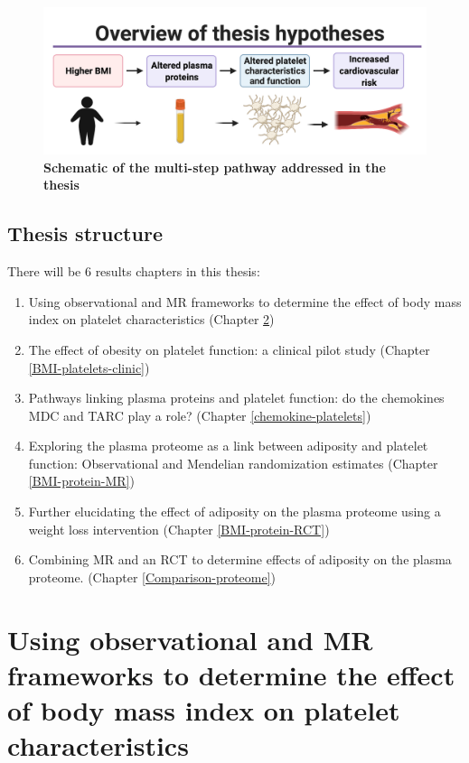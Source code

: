 \documentclass[11pt,twoside]{bristolthesis}
\providecommand{\tightlist}{%
  \setlength{\itemsep}{0pt}\setlength{\parskip}{0pt}}
\begin{document}
\begin{figure}
\includegraphics{figure/Intro_background/Thesis_graphic_overview_without_chapters} \caption[Schematic of the multi-step pathway addressed in the thesis]{\textbf{Schematic of the multi-step pathway addressed in the thesis}}\label{fig:Thesis-schematic}
\end{figure}
\hypertarget{thesis-structure}{%
\section{Thesis structure}\label{thesis-structure}}

There will be 6 results chapters in this thesis:
\begin{enumerate}
\def\labelenumi{\arabic{enumi})}
\tightlist
\item
  Using observational and MR frameworks to determine the effect of body mass index on platelet characteristics (Chapter \ref{BMI-platelets-INTERVAL})
\item
  The effect of obesity on platelet function: a clinical pilot study (Chapter \ref{BMI-platelets-clinic})
\item
  Pathways linking plasma proteins and platelet function: do the chemokines MDC and TARC play a role? (Chapter \ref{chemokine-platelets})
\item
  Exploring the plasma proteome as a link between adiposity and platelet function: Observational and Mendelian randomization estimates (Chapter \ref{BMI-protein-MR})
\item
  Further elucidating the effect of adiposity on the plasma proteome using a weight loss intervention (Chapter \ref{BMI-protein-RCT})
\item
  Combining MR and an RCT to determine effects of adiposity on the plasma proteome. (Chapter \ref{Comparison-proteome})
\end{enumerate}
\hypertarget{BMI-platelets-INTERVAL}{%
\chapter{Using observational and MR frameworks to determine the effect of body mass index on platelet characteristics}\label{BMI-platelets-INTERVAL}}
\end{document}
